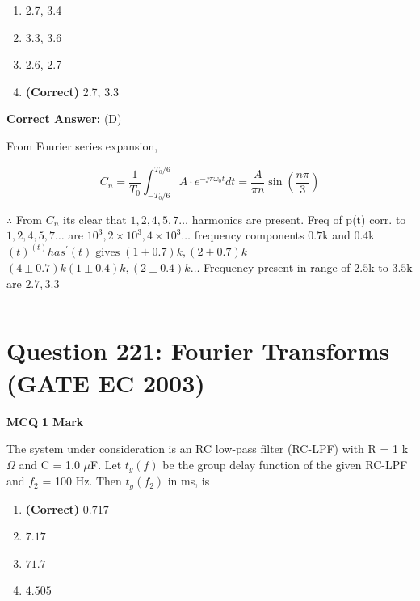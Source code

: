 \documentclass[11pt,a4paper]{article}
\begin{document}
\begin{enumerate}[label=(\Alph*)]
    \item 2.7, 3.4
    \item 3.3, 3.6
    \item 2.6, 2.7
    \item \textbf{(Correct)} 2.7, 3.3
\end{enumerate}

\noindent \textbf{Correct Answer:} (D)

\begin{tcolorbox}[solbox, title=Detailed Solution -- Question 220]
From Fourier series expansion,

\[
C_{n}=\frac{1}{T_{0}} \int_{-T_{0} / 6}^{T_{0} / 6} A \cdot e^{-j \pi \omega_{0} t} d t=\frac{A}{\pi n} \sin \left(\frac{n \pi}{3}\right)
\]

$\therefore$ From $C_{n}$ its clear that $1,2,4,5,7 \ldots$ harmonics  are present.
 Freq of p(t) corr. to $1,2,4,5,7\ldots$ are $10^{3} , 2 \times 10^{3}, 4 \times 10^{3} \ldots$
 frequency components $0.7 \mathrm{k}$ and $0.4 \mathrm{k}$
$(t)^{(t)} h a s^{\prime}(t) \operatorname{gives}(1 \pm 0.7) k,(2 \pm 0.7) k$
$(4 \pm 0.7) k(1 \pm 0.4) k,(2 \pm 0.4) k \ldots$
 Frequency present in range of $2.5 \mathrm{k}$ to $3.5 \mathrm{k}$ are
$2.7, 3.3$
\end{tcolorbox}

\vspace{1.5em}
\hrule
\vspace{1.5em}

\section*{Question 221: Fourier Transforms (GATE EC 2003)}
\noindent \textbf{\color{primary}MCQ} \hfill \textbf{\color{secondary}1 Mark}


\noindent The system under consideration is an RC low-pass filter (RC-LPF) with R = 1 k$\Omega$ and C = 1.0 $\mu$F. 
Let $t_{g}(f)$ be the group delay function of the given RC-LPF and $f_{2}$ = 100 Hz. Then $t_{g}(f_{2})$ in ms, is


\begin{enumerate}[label=(\Alph*)]
    \item \textbf{(Correct)} $0.717$
    \item $7.17$
    \item $71.7$
    \item $4.505$
\end{enumerate}
\end{document}
